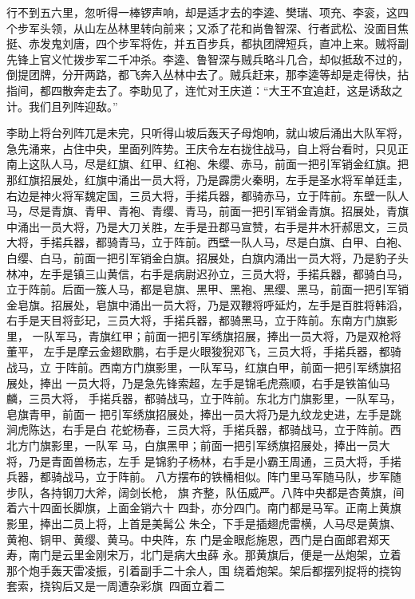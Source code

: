 行不到五六里，忽听得一棒锣声响，却是适才去的李逵、樊瑞、项充、李衮，这四
个步军头领，从山左丛林里转向前来；又添了花和尚鲁智深、行者武松、没面目焦
挺、赤发鬼刘唐，四个步军将佐，并五百步兵，都执团牌短兵，直冲上来。贼将副
先锋上官义忙拨步军二千冲杀。李逵、鲁智深与贼兵略斗几合，却似抵敌不过的，
倒提团牌，分开两路，都飞奔入丛林中去了。贼兵赶来，那李逵等却是走得快，拈
指间，都四散奔走去了。李助见了，连忙对王庆道：“大王不宜追赶，这是诱敌之
计。我们且列阵迎敌。”

李助上将台列阵兀是未完，只听得山坡后轰天子母炮响，就山坡后涌出大队军将，
急先涌来，占住中央，里面列阵势。王庆令左右拢住战马，自上将台看时，只见正
南上这队人马，尽是红旗、红甲、红袍、朱缨、赤马，前面一把引军销金红旗。把
那红旗招展处，红旗中涌出一员大将，乃是霹雳火秦明，左手是圣水将军单廷圭，
右边是神火将军魏定国，三员大将，手掿兵器，都骑赤马，立于阵前。东壁一队人
马，尽是青旗、青甲、青袍、青缨、青马，前面一把引军销金青旗。招展处，青旗
中涌出一员大将，乃是大刀关胜，左手是丑郡马宣赞，右手是井木犴郝思文，三员
大将，手掿兵器，都骑青马，立于阵前。西壁一队人马，尽是白旗、白甲、白袍、
白缨、白马，前面一把引军销金白旗。招展处，白旗内涌出一员大将，乃是豹子头
林冲，左手是镇三山黄信，右手是病尉迟孙立，三员大将，手掿兵器，都骑白马，
立于阵前。后面一簇人马，都是皂旗、黑甲、黑袍、黑缨、黑马，前面一把引军销
金皂旗。招展处，皂旗中涌出一员大将，乃是双鞭将呼延灼，左手是百胜将韩滔，
右手是天目将彭玘，三员大将，手掿兵器，都骑黑马，立于阵前。东南方门旗影里，
一队军马，青旗红甲；前面一把引军绣旗招展，捧出一员大将，乃是双枪将董平，
左手是摩云金翅欧鹏，右手是火眼狻猊邓飞，三员大将，手掿兵器，都骑战马，立
于阵前。西南方门旗影里，一队军马，红旗白甲，前面一把引军绣旗招展处，捧出
一员大将，乃是急先锋索超，左手是锦毛虎燕顺，右手是铁笛仙马麟，三员大将，
手掿兵器，都骑战马，立于阵前。东北方门旗影里，一队军马，皂旗青甲，前面一
把引军绣旗招展处，捧出一员大将乃是九纹龙史进，左手是跳涧虎陈达，右手是白
花蛇杨春，三员大将，手掿兵器，都骑战马，立于阵前。西北方门旗影里，一队军
马，白旗黑甲；前面一把引军绣旗招展处，捧出一员大将，乃是青面兽杨志，左手
是锦豹子杨林，右手是小霸王周通，三员大将，手掿兵器，都骑战马，立于阵前。
八方摆布的铁桶相似。阵门里马军随马队，步军随步队，各持钢刀大斧，阔剑长枪，
旗齐整，队伍威严。八阵中央都是杏黄旗，间着六十四面长脚旗，上面金销六十
四卦，亦分四门。南门都是马军。正南上黄旗影里，捧出二员上将，上首是美髯公
朱仝，下手是插翅虎雷横，人马尽是黄旗、黄袍、铜甲、黄缨、黄马。中央阵，东
门是金眼彪施恩，西门是白面郎君郑天寿，南门是云里金刚宋万，北门是病大虫薛
永。那黄旗后，便是一丛炮架，立着那个炮手轰天雷凌振，引着副手二十余人，围
绕着炮架。架后都摆列捉将的挠钩套索，挠钩后又是一周遭杂彩旗，四面立着二

